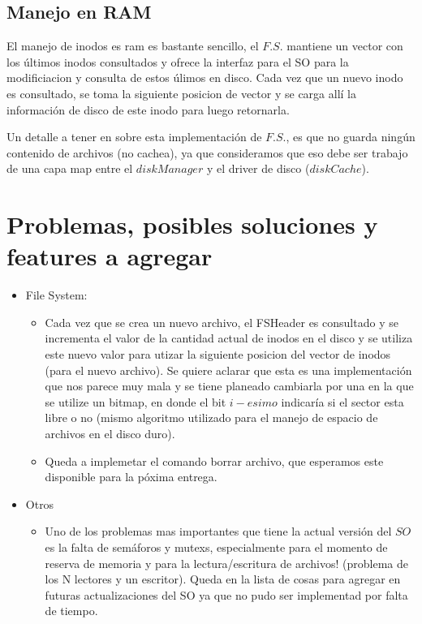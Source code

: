 \documentclass[english]{article}
\begin{document}
\subsection{Manejo en RAM}

El manejo de inodos es ram es bastante sencillo, el $F.S.$ mantiene
un vector con los últimos inodos consultados y ofrece la interfaz
para el SO para la modificiacion y consulta de estos úlimos en disco.
Cada vez que un nuevo inodo es consultado, se toma la siguiente posicion
de vector y se carga allí la información de disco de este inodo para
luego retornarla.

Un detalle a tener en sobre esta implementación de $F.S.$, es que
no guarda ningún contenido de archivos (no cachea), ya que consideramos
que eso debe ser trabajo de una capa map entre el $diskManager$ y
el driver de disco ($diskCache$).

\pagebreak{}


\section{Problemas, posibles soluciones y features a agregar}
\begin{itemize}
\item File System:

\begin{itemize}
\item Cada vez que se crea un nuevo archivo, el FSHeader es consultado y
se incrementa el valor de la cantidad actual de inodos en el disco
y se utiliza este nuevo valor para utizar la siguiente posicion del
vector de inodos (para el nuevo archivo). Se quiere aclarar que esta
es una implementación que nos parece muy mala y se tiene planeado
cambiarla por una en la que se utilize un bitmap, en donde el bit
$i-esimo$ indicaría si el sector esta libre o no (mismo algoritmo
utilizado para el manejo de espacio de archivos en el disco duro). 
\item Queda a implemetar el comando borrar archivo, que esperamos este disponible
para la póxima entrega.
\end{itemize}
\item Otros

\begin{itemize}
\item Uno de los problemas mas importantes que tiene la actual versión del
$SO$ es la falta de semáforos y mutexs, especialmente para el momento
de reserva de memoria y para la lectura/escritura de archivos! (problema
de los N lectores y un escritor). Queda en la lista de cosas para
agregar en futuras actualizaciones del SO ya que no pudo ser implementad
por falta de tiempo.\end{itemize}
\end{itemize}
\end{document}
